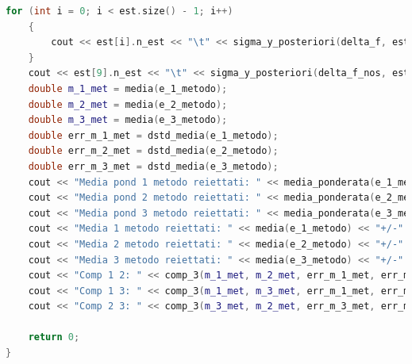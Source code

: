 \documentclass[a4paper,11pt,oneside]{article}
\begin{document}
\begin{lstlisting}[language=C++, label=lst:seconda_parte, caption=seconda\_parte]
	for (int i = 0; i < est.size() - 1; i++)
	{
		cout << est[i].n_est << "\t" << sigma_y_posteriori(delta_f, est[i].delta_x_all) << "\t" << sigma_y_posteriori(delta_f, est[i].delta_x_acc) << endl;
	}
	cout << est[9].n_est << "\t" << sigma_y_posteriori(delta_f_nos, est[9].delta_x_all) << "\t" << sigma_y_posteriori(delta_f_nos, est[9].delta_x_acc) << endl;
	double m_1_met = media(e_1_metodo);
	double m_2_met = media(e_2_metodo);
	double m_3_met = media(e_3_metodo);
	double err_m_1_met = dstd_media(e_1_metodo);
	double err_m_2_met = dstd_media(e_2_metodo);
	double err_m_3_met = dstd_media(e_3_metodo);
	cout << "Media pond 1 metodo reiettati: " << media_ponderata(e_1_metodo, err_e_1_metodo) << "+/-" << errore_media_ponderata(err_e_1_metodo) << endl;
	cout << "Media pond 2 metodo reiettati: " << media_ponderata(e_2_metodo, err_e_2_metodo) << "+/-" << errore_media_ponderata(err_e_2_metodo) << endl;
	cout << "Media pond 3 metodo reiettati: " << media_ponderata(e_3_metodo, err_e_3_metodo) << "+/-" << errore_media_ponderata(err_e_3_metodo) << endl;
	cout << "Media 1 metodo reiettati: " << media(e_1_metodo) << "+/-" << dstd_media(e_1_metodo) << endl;
	cout << "Media 2 metodo reiettati: " << media(e_2_metodo) << "+/-" << dstd_media(e_2_metodo) << endl;
	cout << "Media 3 metodo reiettati: " << media(e_3_metodo) << "+/-" << dstd_media(e_3_metodo) << endl;
	cout << "Comp 1 2: " << comp_3(m_1_met, m_2_met, err_m_1_met, err_m_2_met) << endl;
	cout << "Comp 1 3: " << comp_3(m_1_met, m_3_met, err_m_1_met, err_m_3_met) << endl;
	cout << "Comp 2 3: " << comp_3(m_3_met, m_2_met, err_m_3_met, err_m_2_met) << endl;
	
	return 0;
}
\end{lstlisting}
\end{document}
